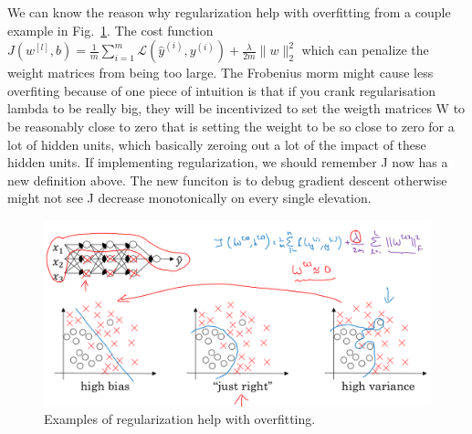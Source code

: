 \documentclass[a4paper]{article}
\begin{document}
We can know the reason why regularization help with overfitting from a couple example in Fig.~\ref{p10}. The cost function $J(w^{[l]},b)=\frac{1}{m}\sum_{i=1}^{m}\mathcal{L}(\hat{y}^{(i)},y^{(i)})+\frac{\lambda}{2m}\parallel w\parallel^2_2$ which can penalize the weight matrices from being too large. The Frobenius morm might cause less overfiting because of one piece of intuition is that if you crank regularisation lambda to be really big, they will be incentivized to set the weigth matrices W to be reasonably close to zero that is setting the weight to be so close to zero for a lot of hidden units, which basically zeroing out a lot of the impact of these hidden units. If implementing regularization, we should remember J now has a new definition above. The new funciton is to debug gradient descent otherwise might not see J decrease monotonically on every single elevation. 
\begin{figure}
	\begin{center}
		\includegraphics[scale=0.3]{figures/11.png}
	\end{center}
	\caption{Examples of regularization help with overfitting.}
	\label{p10}
\end{figure}
\end{document}
